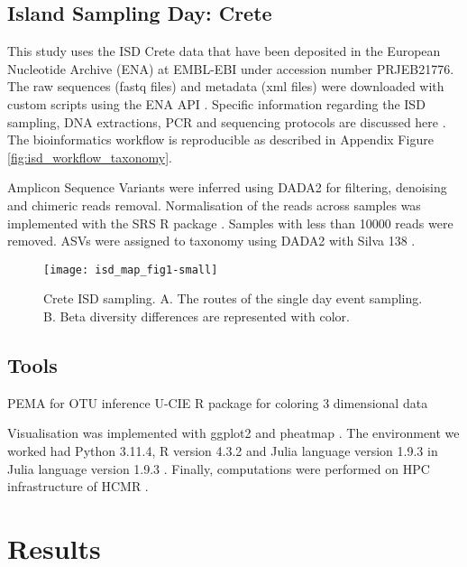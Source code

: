 \subsection{Island Sampling Day: Crete}\label{isd_data}

This study uses the ISD Crete data that have been deposited
in the European Nucleotide Archive (ENA) at EMBL-EBI under accession number PRJEB21776.
The raw sequences (fastq files) and metadata (xml files) were downloaded with custom scripts using the ENA API \parencite{Yuan2023}.
Specific information regarding the ISD sampling, DNA extractions, PCR and sequencing
protocols are discussed here \parencite{holm2024}. The bioinformatics workflow is 
reproducible as described in Appendix Figure \ref{fig:isd_workflow_taxonomy}.

Amplicon Sequence Variants were inferred using DADA2 \parencite{Callahan2016} for 
filtering, denoising and chimeric reads removal. Normalisation of the reads
across samples was implemented with the SRS R package \parencite{Beule2020}. Samples
with less than 10000 reads were removed. ASVs were assigned to taxonomy using 
DADA2 with Silva 138 \parencite{quast_silva_2013}.

\begin{figure}[t] 
    \centering\texttt{[image: isd\_map\_fig1-small]}
    \caption{Crete ISD sampling. A. The routes of the single day event sampling. B. Beta diversity differences are represented with color.}
    \label{fig:isd_crete_sampling}
\end{figure}



\subsection{Tools}\label{Coding environment}
PEMA for OTU inference \parencite{zafeiropoulos2020pema}
U-CIE R package for coloring 3 dimensional data \parencite{Koutrouli2022}

Visualisation was implemented with ggplot2 \parencite{wickham_ggplot2_2016} and pheatmap \parencite{Kolde2019}.
The environment we worked had Python 3.11.4, R version 4.3.2 \parencite{rcoreteam}
and Julia language version 1.9.3 \parencite{Julia-2017}in Julia language version 1.9.3 \parencite{Julia-2017}.
Finally, computations were performed on HPC infrastructure of HCMR \parencite{zafeiropoulos_0s_2021}.

\section{Results}\label{results}

